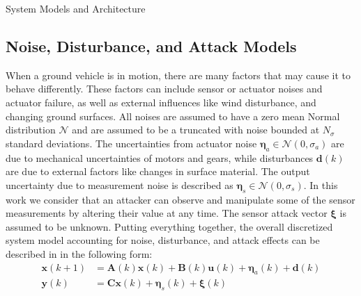 \begin{section}{System Models and Architecture}
 \subsection{Noise, Disturbance, and Attack Models}
When a ground vehicle is in motion, there are many factors that may cause it to behave differently. These factors can include sensor or actuator noises and actuator failure, as well as external influences like wind disturbance, and changing ground surfaces. All noises are assumed to have a zero mean Normal distribution $\mathcal{N}$ and are assumed to be a truncated with noise bounded at $N_{\sigma}$ standard deviations. The uncertainties from actuator noise $\bm{\eta}_a \in \mathcal{N}(0,\sigma_a)$ are due to mechanical uncertainties of motors and gears, while disturbances $\bm{d}(k)$ are due to external factors like changes in surface material. The output uncertainty due to measurement noise is described as $\bm{\eta}_s \in \mathcal{N}(0,\sigma_s)$. In this work we consider that an attacker can observe and manipulate some of the sensor measurements by altering their value at any time. The sensor attack vector $\bm{\xi}$ is assumed to be unknown. Putting everything together, the overall discretized system model accounting for noise, disturbance, and attack effects can be described in in the following form:
    \begin{equation}
    \begin{split}
    \label{eq:discrete_SS}
	\bm{x}(k+1)&=\bm{A}(k)\bm{x}(k)+\bm{B}(k)\bm{u}(k)+\bm{\eta}_a(k)+\bm{d}(k) \\
	\bm{y}(k)&=\bm{C}\bm{x}(k)+\bm{\eta}_s(k)+\bm{\xi}(k)
	\end{split}
	\end{equation}




\end{section}
